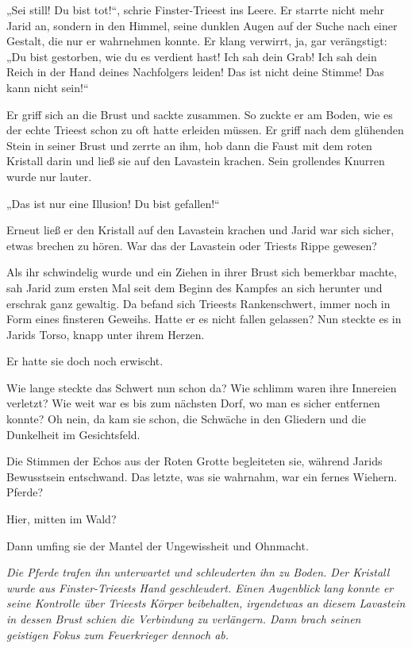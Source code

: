 „Sei still! Du bist tot!“, schrie Finster-Trieest ins Leere. Er starrte nicht mehr Jarid an, sondern in den Himmel, seine dunklen Augen auf der Suche nach einer Gestalt, die nur er wahrnehmen konnte. Er klang verwirrt, ja, gar verängstigt: „Du bist gestorben, wie du es verdient hast! Ich sah dein Grab! Ich sah dein Reich in der Hand deines Nachfolgers leiden! Das ist nicht deine Stimme! Das kann nicht sein!“

Er griff sich an die Brust und sackte zusammen. So zuckte er am Boden, wie es der echte Trieest schon zu oft hatte erleiden müssen. Er griff nach dem glühenden Stein in seiner Brust und zerrte an ihm, hob dann die Faust mit dem roten Kristall darin und ließ sie auf den Lavastein krachen. Sein grollendes Knurren wurde nur lauter.

„Das ist nur eine Illusion! Du bist gefallen!“

Erneut ließ er den Kristall auf den Lavastein krachen und Jarid war sich sicher, etwas brechen zu hören. War das der Lavastein oder Triests Rippe gewesen?

Als ihr schwindelig wurde und ein Ziehen in ihrer Brust sich bemerkbar machte, sah Jarid zum ersten Mal seit dem Beginn des Kampfes an sich herunter und erschrak ganz gewaltig. Da befand sich Trieests Rankenschwert, immer noch in Form eines finsteren Geweihs. Hatte er es nicht fallen gelassen? Nun steckte es in Jarids Torso, knapp unter ihrem Herzen.

Er hatte sie doch noch erwischt.

Wie lange steckte das Schwert nun schon da? Wie schlimm waren ihre Innereien verletzt? Wie weit war es bis zum nächsten Dorf, wo man es sicher entfernen konnte? Oh nein, da kam sie schon, die Schwäche in den Gliedern und die Dunkelheit im Gesichtsfeld.

Die Stimmen der Echos aus der Roten Grotte begleiteten sie, während Jarids Bewusstsein entschwand. Das letzte, was sie wahrnahm, war ein fernes Wiehern. Pferde?

Hier, mitten im Wald?

Dann umfing sie der Mantel der Ungewissheit und Ohnmacht.\bigskip







\textit{Die Pferde trafen ihn unterwartet und schleuderten ihn zu Boden. Der Kristall wurde aus Finster-Trieests Hand geschleudert. Einen Augenblick lang konnte er seine Kontrolle über Trieests Körper beibehalten, irgendetwas an diesem Lavastein in dessen Brust schien die Verbindung zu verlängern. Dann brach seinen geistigen Fokus zum Feuerkrieger dennoch ab.}

